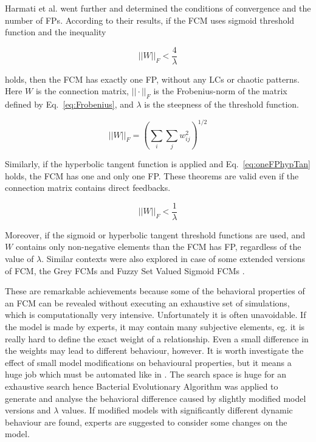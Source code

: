 \documentclass[graybox]{svmult}
\begin{document}
Harmati et al. went further \cite{harmati2018existenceFCM} and determined the conditions of convergence and the number of FPs. According to their results, if the FCM uses sigmoid threshold function and the inequality

\begin{equation}
\label{eq:oneFPsigmoid}
||W||_F < \frac{4}{\lambda}
\end{equation}

holds, then the FCM has exactly one FP, without any LCs or chaotic patterns. Here $W$ is the connection matrix, $||\cdot||_F$ is the Frobenius-norm of the matrix defined by Eq.~\ref{eq:Frobenius}, and $\lambda$ is the steepness of the threshold function.

\begin{equation}
\label{eq:Frobenius}
||W||_F = \left( \sum_i \sum_j w_{ij}^2 \right)^{1/2}
\end{equation}

Similarly, if the hyperbolic tangent function is applied and Eq.~\ref{eq:oneFPhypTan} holds, the FCM has one and only one FP. These theorems are valid even if the connection matrix contains direct feedbacks.

\begin{equation}
\label{eq:oneFPhypTan}
||W||_F < \frac{1}{\lambda}
\end{equation}

Moreover, if the sigmoid or hyperbolic tangent threshold functions are used, and $W$ contains only non-negative elements than the FCM has FP, regardless of the value of $\lambda$. Similar contexts were also explored in case of some extended versions of FCM, the Grey FCMs \cite{harmati2018convergenceGFCM} and Fuzzy Set Valued Sigmoid FCMs \cite{harmati2018existenceFSVFCM}.

These are remarkable achievements because some of the behavioral properties of an FCM can be revealed without executing an exhaustive set of simulations, which is computationally very intensive. Unfortunately it is often unavoidable. If the model is made by experts, it may contain many subjective elements, eg. it is really hard to define the exact weight of a relationship. Even a small difference in the weights may lead to different behaviour, however. It is worth investigate the effect of small model modifications on behavioural properties, but it means a huge job which must be automated like in \cite{hatwagner2019banking,hatwagner2018improved}. The search space is huge for an exhaustive search hence Bacterial Evolutionary Algorithm \cite{nawa1998bacterial} was applied to generate and analyse the behavioral difference caused by slightly modified model versions and $\lambda$ values. If modified models with significantly different dynamic behaviour are found, experts are suggested to consider some changes on the model.
\end{document}
